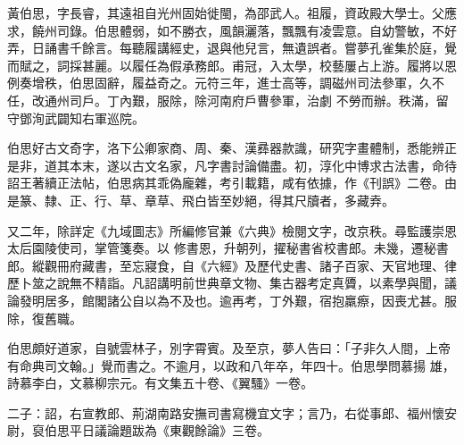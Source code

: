 \begin{pinyinscope}
 黃伯思，字長睿，其遠祖自光州固始徙閩，為邵武人。祖履，資政殿大學士。父應求，饒州司錄。伯思體弱，如不勝衣，風韻灑落，飄飄有凌雲意。自幼警敏，不好弄，日誦書千餘言。每聽履講經史，退與他兒言，無遺誤者。嘗夢孔雀集於庭，覺而賦之，詞採甚麗。以履任為假承務郎。甫冠，入太學，校藝屢占上游。履將以恩例奏增秩，伯思固辭，履益奇之。元符三年，進士高等，調磁州司法參軍，久不任，改通州司戶。丁內艱，服除，除河南府戶曹參軍，治劇
 不勞而辦。秩滿，留守鄧洵武闢知右軍巡院。



 伯思好古文奇字，洛下公卿家商、周、秦、漢彞器款識，研究字畫體制，悉能辨正是非，道其本末，遂以古文名家，凡字書討論備盡。初，淳化中博求古法書，命待詔王著續正法帖，伯思病其乖偽龐雜，考引載籍，咸有依據，作《刊誤》二卷。由是篆、隸、正、行、草、章草、飛白皆至妙絕，得其尺牘者，多藏弆。



 又二年，除詳定《九域圖志》所編修官兼《六典》檢閱文字，改京秩。尋監護崇恩太后園陵使司，掌管箋奏。以
 修書恩，升朝列，擢秘書省校書郎。未幾，遷秘書郎。縱觀冊府藏書，至忘寢食，自《六經》及歷代史書、諸子百家、天官地理、律歷卜筮之說無不精詣。凡詔講明前世典章文物、集古器考定真贗，以素學與聞，議論發明居多，館閣諸公自以為不及也。逾再考，丁外艱，宿抱羸瘵，因喪尤甚。服除，復舊職。



 伯思頗好道家，自號雲林子，別字霄賓。及至京，夢人告曰：「子非久人間，上帝有命典司文翰。」覺而書之。不逾月，以政和八年卒，年四十。伯思學問慕揚
 雄，詩慕李白，文慕柳宗元。有文集五十卷、《翼騷》一卷。



 二子：詔，右宣教郎、荊湖南路安撫司書寫機宜文字；言乃，右從事郎、福州懷安尉，裒伯思平日議論題跋為《東觀餘論》三卷。



\end{pinyinscope}